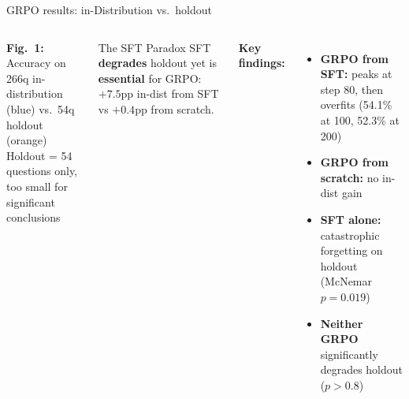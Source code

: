\documentclass[aspectratio=169,10pt]{beamer}
\begin{document}
\begin{frame}{GRPO results: in-Distribution vs.\ holdout}
\begin{columns}[T]

\vspace{0.1em}
{\small\textbf{Fig.\ 1:} Accuracy on 266q in-distribution (blue) vs.\ 54q holdout (orange)}\\
{\footnotesize\color{gray} Holdout = 54 questions only, too small for significant conclusions}


\begin{alertblock}{\small The SFT Paradox}
{\small SFT \textbf{degrades} holdout yet is \textbf{essential} for GRPO: $+7.5$pp in-dist from SFT vs $+0.4$pp from scratch.}
\end{alertblock}

\vspace{0.3em}
\textbf{\small Key findings:}
\begin{itemize}\footnotesize
  \item \textbf{GRPO from SFT:} peaks at step 80, then overfits (54.1\% at 100, 52.3\% at 200)
  \item \textbf{GRPO from scratch:} no in-dist gain
  \item \textbf{SFT alone:} catastrophic forgetting on holdout (McNemar $p\!=\!0.019$)
  \item \textbf{Neither GRPO} significantly degrades holdout ($p > 0.8$)
\end{itemize}

\vspace{0.3em}
\end{columns}
\end{frame}
\end{document}
